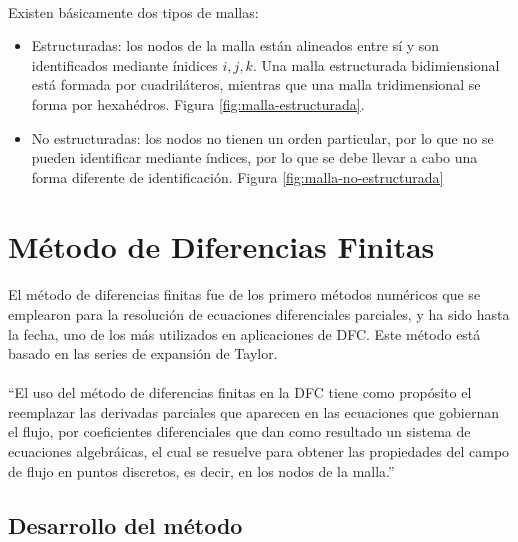 \documentclass[letterpaper, openright, 12pt]{book}
\begin{document}
	\paragraph*{}
	Existen básicamente dos tipos de mallas:
	\begin{itemize}
		\item Estructuradas: los nodos de la malla están alineados entre sí y son identificados mediante ínidices $i, j, k$. Una malla estructurada bidimiensional está formada por cuadriláteros, mientras que una malla tridimensional se forma por hexahédros. Figura \ref{fig:malla-estructurada}.
		\item No estructuradas: los nodos no tienen un orden particular, por lo que no se pueden identificar mediante índices, por lo que se debe llevar a cabo una forma diferente de identificación. Figura \ref{fig:malla-no-estructurada}
	\end{itemize}
	
	
	
	\section{Método de Diferencias Finitas}
	\paragraph*{}
	El método de diferencias finitas fue de los primero métodos numéricos que se emplearon para la resolución de ecuaciones diferenciales parciales, y ha sido hasta la fecha, uno de los más utilizados en aplicaciones de DFC. Este método está basado en las series de expansión de Taylor.
	
	\paragraph*{}
	``El uso del método de diferencias finitas en la DFC tiene como propósito el reemplazar las derivadas parciales que aparecen en las ecuaciones que gobiernan el flujo, por coeficientes diferenciales que dan como resultado un sistema de ecuaciones algebráicas, el cual se resuelve para obtener las propiedades del campo de flujo en puntos discretos, es decir, en los nodos de la malla.'' \cite{anderson-yotros}
	
	\subsection{Desarrollo del método}
\end{document}

